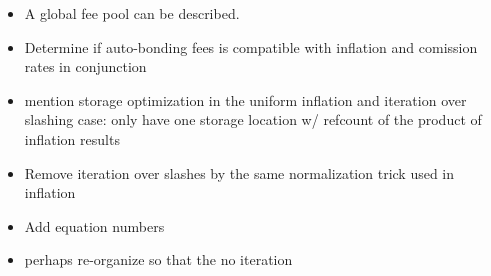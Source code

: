 \documentclass[]{article}
\begin{document}
\begin{itemize}
	\item A global fee pool can be described.
	\item Determine if auto-bonding fees is compatible with inflation and comission rates in conjunction
	\item mention storage optimization in the uniform inflation and iteration over slashing case: only have one storage location w/ refcount of the product of inflation results
	\item Remove iteration over slashes by the same normalization trick used in inflation
	\item Add equation numbers
	\item perhaps re-organize so that the no iteration
\end{itemize}
\end{document}

